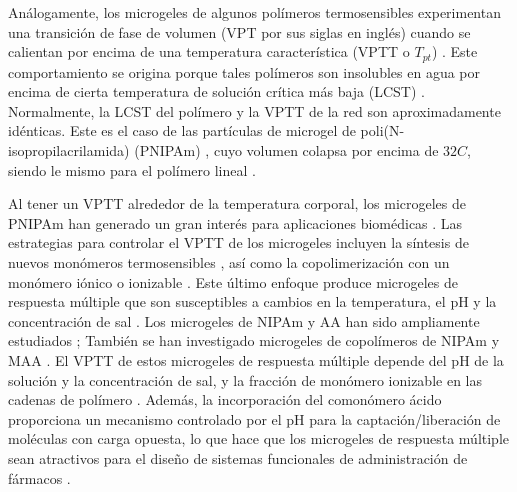 An\'alogamente, los microgeles de algunos pol\'imeros termosensibles experimentan una transici\'on de fase de volumen (VPT por sus siglas en ingl\'es) cuando se calientan por encima de una temperatura caracter\'istica (VPTT o $T_{pt}$) \cite{Pelton1986,Pelton2000}.
Este comportamiento se origina porque tales pol\'imeros son insolubles en agua por encima de cierta temperatura de soluci\'on cr\'itica m\'as baja (LCST) \cite{Kawaguchi2020}.
Normalmente, la LCST del pol\'imero y la VPTT de la red  son aproximadamente id\'enticas. 
Este es el caso de las part\'iculas de microgel de poli(N-isopropilacrilamida) (PNIPAm) \cite{Pelton1986}, cuyo volumen colapsa por encima de $32 C$, siendo le mismo para el  pol\'imero lineal \cite{Schild1992}.

Al tener un VPTT alrededor de la temperatura corporal, los microgeles de PNIPAm han generado un gran inter\'es para aplicaciones biom\'edicas \cite{Guan2011}.
Las estrategias para controlar el VPTT de los microgeles incluyen la s\'intesis de nuevos mon\'omeros termosensibles  \cite{Cai2007,Macchione2019}, as\'i como la copolimerizaci\'on con un mon\'omero i\'onico o ionizable  \cite{Hirose1987,Lopez2020}.
Este \'ultimo enfoque produce microgeles de respuesta m\'ultiple que son susceptibles a cambios en la temperatura, el pH y la concentraci\'on de sal  \cite{snowden1996colloidal, Farooqi2017}.
Los microgeles de NIPAm y AA han sido ampliamente estudiados \cite{Morris1997, Jones2000,Bradley2005,Begum2016};
Tambi\'en se han investigado microgeles de copol\'imeros de NIPAm y MAA  \cite{Dowding2000,Hoare2004,Giussi2015}.
El VPTT de estos microgeles de respuesta m\'ultiple depende del pH de la soluci\'on y la concentraci\'on de sal, y la fracci\'on de mon\'omero ionizable en las cadenas de pol\'imero  \cite{Morris1997,Jones2000, Hoare2004, Bradley2005, Lee2008,Wong2009,Hamzavi2016}.
Adem\'as, la incorporaci\'on del comon\'omero \'acido proporciona un mecanismo controlado por el pH para la captaci\'on/liberaci\'on de mol\'eculas con carga opuesta, lo que hace que los microgeles de respuesta m\'ultiple sean atractivos para el dise\~no de sistemas funcionales de administraci\'on de f\'armacos \cite{Liu2017}.

